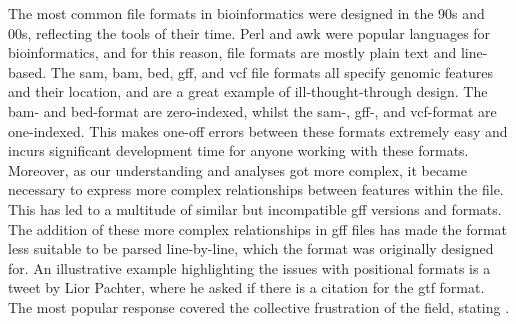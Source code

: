 The most common file formats in bioinformatics were designed in the 90s and 00s, reflecting the tools of their time. Perl and awk were popular languages for bioinformatics, and for this reason, file formats are mostly plain text and line-based. The sam, bam, bed, gff, and vcf file formats all specify genomic features and their location, and are a great example of ill-thought-through design. The bam- and bed-format are zero-indexed\cite{Li2009}, whilst the sam-, gff-, and vcf-format are one-indexed\cite{Li2009,Danecek2011}. This makes one-off errors between these formats extremely easy and incurs significant development time for anyone working with these formats. Moreover, as our understanding and analyses got more complex, it became necessary to express more complex relationships between features within the file. This has led to a multitude of similar but incompatible gff versions and formats. The addition of these more complex relationships in gff files has made the format less suitable to be parsed line-by-line, which the format was originally designed for. An illustrative example highlighting the issues with positional formats is a tweet by Lior Pachter, where he asked if there is a citation for the gtf format. The most popular response covered the collective frustration of the field, stating .


